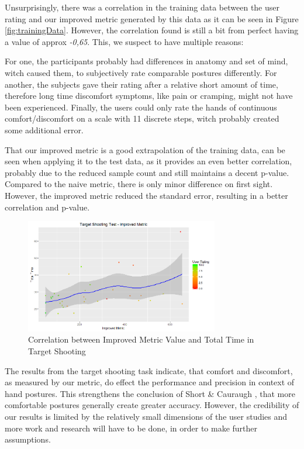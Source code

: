 \documentclass{sig-alternate-05-2015}
\begin{document}
Unsurprisingly, there was a correlation in the training data between the user rating and our improved metric generated by this data as it can be seen in Figure \ref{fig:trainingData}. However, the correlation found is still a bit from perfect having a value of approx \textsl{-0,65}. This, we  suspect  to have  multiple  reasons: 

For one, the participants probably had differences in anatomy and set of mind, witch caused them, to subjectively rate comparable postures differently. For another, the subjects gave their rating after a relative short amount of time, therefore long time discomfort symptoms, like pain or cramping, might not have been experienced. Finally, the users could only rate the hands of continuous comfort/discomfort on a scale with 11 discrete steps, witch probably created some additional error.

That our improved metric is a good extrapolation of the training data, can be seen when applying it to the test data, as it provides an even better correlation, probably due to the reduced sample count and still maintains a decent p-value. Compared to the naive metric, there is only minor difference on first sight. However, the improved metric reduced the standard error, resulting in a better correlation and p-value.

\begin{figure}[h]
\centering
\includegraphics[width=8.45cm]{targetShootingImproved}
\vspace{-20pt}
\caption{Correlation between Improved Metric Value and Total Time in Target Shooting}
\label{fig:targetShooting}
\vspace{-10pt}
\end{figure}

The results from the target shooting task indicate, that comfort and discomfort, as measured by our metric, do effect the performance and precision in context of hand postures. This strengthens the conclusion of Short \& Cauraugh \cite{short1999precision}, that more comfortable postures generally create greater accuracy. However, the credibility of our results is limited by the relatively small dimensions of the user studies and more work and research will have to be done, in order to make further assumptions.
\end{document}

